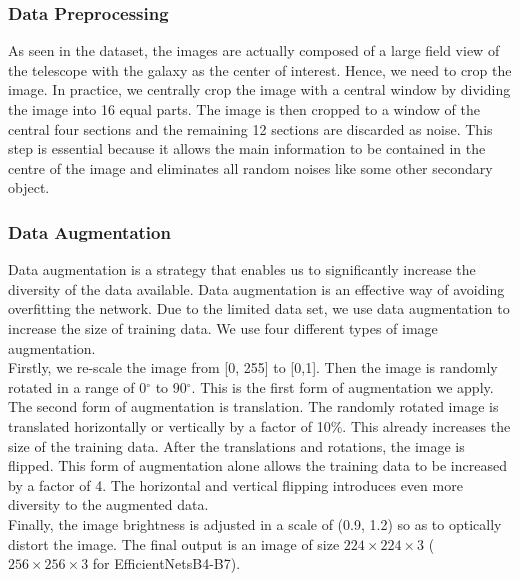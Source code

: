 \documentclass[fleqn,usenatbib]{mnras}
\begin{document}
\subsubsection{Data Preprocessing}
\hspace{0.25 in}As seen in the dataset, the images are actually composed of a large field view of the telescope with the galaxy as the center of interest. Hence, we need to crop the image. In practice, we centrally crop the image with a central window by dividing the image into 16 equal parts. The image is then cropped to a window of the central four sections and the remaining 12 sections are discarded as noise. This step is essential because it allows the main information to be contained in the centre of the image and eliminates all random noises like some other secondary object.
\subsubsection{Data Augmentation}
\hspace{0.25 in}Data augmentation is a strategy that enables us to significantly increase the diversity of the data available. Data augmentation is an effective way of avoiding overfitting the network. Due to the limited data set, we use data augmentation to increase the size of training data. We use four different types of image augmentation. \\
\hspace{0.25 in}Firstly, we re-scale the image from [0, 255] to [0,1]. Then the image is randomly rotated in a range of 0$^\circ$ to 90$^\circ$. This is the first form of augmentation we apply. The second form of augmentation is translation. The randomly rotated image is translated horizontally or vertically by a factor of 10\%. This already increases the size of the training data. After the translations and rotations, the image is flipped. This form of augmentation alone allows the training data to be increased by a factor of 4. The horizontal and vertical flipping introduces even more diversity to the augmented data.\\
\hspace{0.25 in}Finally, the image brightness is adjusted in a scale of (0.9, 1.2) so as to optically distort the image. The final output is an image of size $224\times224\times3$ ($256\times256\times3$ for EfficientNetsB4-B7).
\end{document}

